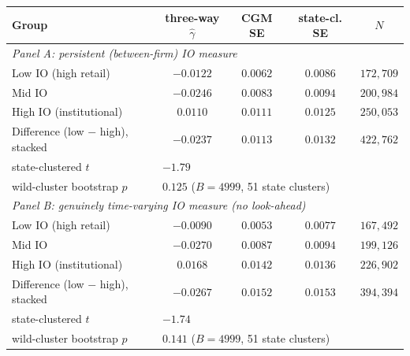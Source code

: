 \begin{tabular}{lcccc}
\hline\hline
Group & three-way $\hat\gamma$ & CGM SE & state-cl. SE & $N$ \\
\hline
\multicolumn{5}{l}{\textit{Panel A: persistent (between-firm) IO measure}} \\
Low IO (high retail) & $-0.0122$ & $0.0062$ & $0.0086$ & $172,709$ \\
Mid IO & $-0.0246$ & $0.0083$ & $0.0094$ & $200,984$ \\
High IO (institutional) & $0.0110$ & $0.0111$ & $0.0125$ & $250,053$ \\
Difference (low $-$ high), stacked & $-0.0237$ & $0.0113$ & $0.0132$ & $422,762$ \\
\quad state-clustered $t$ & \multicolumn{4}{l}{$-1.79$} \\
\quad wild-cluster bootstrap $p$ & \multicolumn{4}{l}{$0.125$ ($B=4999$, 51 state clusters)} \\
\hline
\multicolumn{5}{l}{\textit{Panel B: genuinely time-varying IO measure (no look-ahead)}} \\
Low IO (high retail) & $-0.0090$ & $0.0053$ & $0.0077$ & $167,492$ \\
Mid IO & $-0.0270$ & $0.0087$ & $0.0094$ & $199,126$ \\
High IO (institutional) & $0.0168$ & $0.0142$ & $0.0136$ & $226,902$ \\
Difference (low $-$ high), stacked & $-0.0267$ & $0.0152$ & $0.0153$ & $394,394$ \\
\quad state-clustered $t$ & \multicolumn{4}{l}{$-1.74$} \\
\quad wild-cluster bootstrap $p$ & \multicolumn{4}{l}{$0.141$ ($B=4999$, 51 state clusters)} \\
\hline\hline
\end{tabular}
